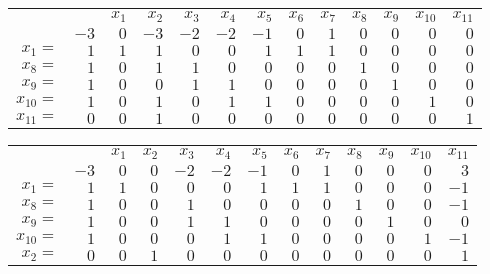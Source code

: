\documentclass{article}
\theoremstyle{definition}
\begin{document}
\egroup
\bgroup
\def\arraystretch{1.5}
\begin{table}[H]
  \begin{tabular}{r|r|rrrrrrrrrrr|}
  \cline{2-13}
    &   & $x_1$ & $x_2$ & $x_3$ & $x_4$ & $x_5$ & $x_6$ & $x_7$ & $x_8$ & $x_9$ & $x_10$ & $x_11$ \\ \cline{2-13}
    & $-3$ & $0$ & $-3$ & $-2$ & $-2$ & $-1$ & $0$ & $1$ & $0$ & $0$ & $0$ & $0$ \\ \cline{2-13}
  $x_1 = $ & $1$ & $1$ & $1$ & $0$ & $0$ & $1$ & $1$ & $1$ & $0$ & $0$ & $0$ & $0$ \\ 
  $x_8 = $ & $1$ & $0$ & $1$ & $1$ & $0$ & $0$ & $0$ & $0$ & $1$ & $0$ & $0$ & $0$ \\ 
  $x_9 = $ & $1$ & $0$ & $0$ & $1$ & $1$ & $0$ & $0$ & $0$ & $0$ & $1$ & $0$ & $0$ \\ 
  $x_10 = $ & $1$ & $0$ & $1$ & $0$ & $1$ & $1$ & $0$ & $0$ & $0$ & $0$ & $1$ & $0$ \\ 
  $x_11 = $ & $0$ & $0$ & $1$ & $0$ & $0$ & $0$ & $0$ & $0$ & $0$ & $0$ & $0$ & $1$ \\ \cline{2-13}
  \end{tabular}
\end{table}
\egroup
\bgroup
\def\arraystretch{1.5}
\begin{table}[H]
  \begin{tabular}{r|r|rrrrrrrrrrr|}
  \cline{2-13}
    &   & $x_1$ & $x_2$ & $x_3$ & $x_4$ & $x_5$ & $x_6$ & $x_7$ & $x_8$ & $x_9$ & $x_10$ & $x_11$ \\ \cline{2-13}
    & $-3$ & $0$ & $0$ & $-2$ & $-2$ & $-1$ & $0$ & $1$ & $0$ & $0$ & $0$ & $3$ \\ \cline{2-13}
  $x_1 = $ & $1$ & $1$ & $0$ & $0$ & $0$ & $1$ & $1$ & $1$ & $0$ & $0$ & $0$ & $-1$ \\ 
  $x_8 = $ & $1$ & $0$ & $0$ & $1$ & $0$ & $0$ & $0$ & $0$ & $1$ & $0$ & $0$ & $-1$ \\ 
  $x_9 = $ & $1$ & $0$ & $0$ & $1$ & $1$ & $0$ & $0$ & $0$ & $0$ & $1$ & $0$ & $0$ \\ 
  $x_10 = $ & $1$ & $0$ & $0$ & $0$ & $1$ & $1$ & $0$ & $0$ & $0$ & $0$ & $1$ & $-1$ \\ 
  $x_2 = $ & $0$ & $0$ & $1$ & $0$ & $0$ & $0$ & $0$ & $0$ & $0$ & $0$ & $0$ & $1$ \\ \cline{2-13}
  \end{tabular}
\end{table}
\egroup
\bgroup
\def\arraystretch{1.5}
\end{document}
